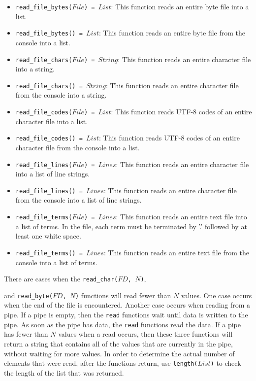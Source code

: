 \begin{itemize}
\item \texttt{read\_file\_bytes($File$) = $List$}: This function reads an entire byte file into a list. 
\item \texttt{read\_file\_bytes() = $List$}: This function reads an entire byte file from the console into a list.
\item \texttt{read\_file\_chars($File$) = $String$}: This function reads an entire character file into a string. 
\item \texttt{read\_file\_chars() = $String$}: This function reads an entire character file from the console into a string. 
\item \texttt{read\_file\_codes($File$) = $List$}: This function reads UTF-8 codes of an entire character file into a list. 
\item \texttt{read\_file\_codes() = $List$}: This function reads UTF-8 codes of an entire character file from the console into a list. 
\item \texttt{read\_file\_lines($File$) = $Lines$}: This function reads an entire character file into a list of line strings.  
\item \texttt{read\_file\_lines() = $Lines$}: This function reads an entire character file from the console into a list of line strings.  
\item \texttt{read\_file\_terms($File$) = $Lines$}: This function reads an entire text file into a list of terms. In the file, each term must be terminated by '.' followed by at least one white space.
\item \texttt{read\_file\_terms() = $Lines$}: This function reads an entire text file from the console into a list of terms.
\end{itemize}

There are cases when the \texttt{read\_char($FD$, $N$)}, and \texttt{read\_byte($FD$, $N$)} functions will read fewer than $N$ values.  One case occurs when the end of the file is encountered.  Another case occurs when reading from a pipe.  If a pipe is empty, then the \texttt{read} functions wait until data is written to the pipe.  As soon as the pipe has data, the \texttt{read} functions read the data.  If a pipe has fewer than $N$ values when a read occurs, then these three functions will return a string that contains all of the values that are currently in the pipe, without waiting for more values.  In order to determine the actual number of elements that were read, after the functions return, use \texttt{length($List$)} to check the length of the list that was returned.

